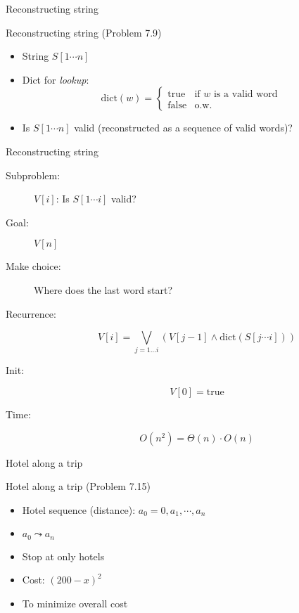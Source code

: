 \begin{frame}{Reconstructing string}
  \begin{exampleblock}{Reconstructing string (Problem 7.9)}
    \begin{itemize}
      \item String $S[1 \cdots n]$
      \item Dict for \emph{lookup}:
		\begin{displaymath}
		  \text{dict}(w) = \left\{ \begin{array}{ll}
			\text{true} & \textrm{if } w \textrm{ is a valid word}\\
			\text{false} & \textrm{o.w.}
		  \end{array} \right.
		\end{displaymath}
	  \item Is $S[1 \cdots n]$ valid (reconstructed as a sequence of valid words)?
    \end{itemize}
  \end{exampleblock}
\end{frame}
\begin{frame}{Reconstructing string}
  \begin{description}
	\item[Subproblem:] $V[i]$: Is $S[1 \cdots i]$ valid?
	\item[Goal:] $V[n]$
	\pause
	\item[Make choice:] Where does the last word start?
	\item[Recurrence:] 
	  \[ 
		V[i] = \bigvee_{j = 1 \ldots i} (V[j-1] \land \text{dict}(S[j \cdots i]))
	  \]
	\pause
	\item[Init:]
	  \[
		V[0] = \text{true}
	  \]
	\item[Time:]
	  \[
		O(n^2) = \Theta(n) \cdot O(n)
	  \]
  \end{description}
\end{frame}
\begin{frame}{Hotel along a trip}
  \begin{exampleblock}{Hotel along a trip (Problem 7.15)}
    \begin{itemize}
      \item Hotel sequence (distance): $a_{0} = 0, a_{1}, \cdots, a_{n}$
      \item $a_0 \leadsto a_n$ 
	  \item Stop at only hotels
      \item Cost: $(200 - x)^{2}$ 
      \item To minimize overall cost
    \end{itemize}
  \end{exampleblock}
\end{frame}
